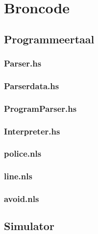 \documentclass[12pt, titlepage]{article}
\begin{document}
\newpage
\appendix
\section{Broncode}
\label{sec:broncode}
\subsection{Programmeertaal}

\subsubsection{Parser.hs}
\label{subsec:parser}


\subsubsection{Parserdata.hs}
\label{subsec:parserdata}


\subsubsection{ProgramParser.hs}
\label{subsec:programparser}


\subsubsection{Interpreter.hs}
\label{subsec:interpreter}

 
\subsubsection{police.nls}
\label{subsec:police}


\subsubsection{line.nls}
\label{subsec:line}


\subsubsection{avoid.nls}
\label{subsec:avoid}


\subsection{Simulator}
\end{document}
